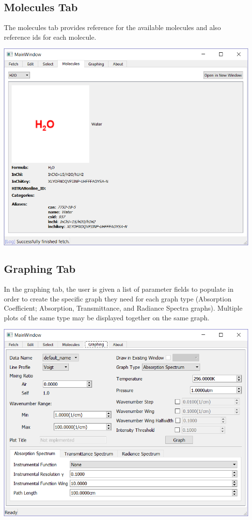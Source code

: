 \documentclass[12pt]{article}
\begin{document}
\subsection{Molecules Tab}
The molecules tab provides reference for the available molecules and also reference ids for each molecule.
\begin{center}
\includegraphics[scale = 0.6]{MainWindow_Molecules}
\end{center}

\subsection{Graphing Tab}
In the graphing tab, the user is given a list of parameter fields to populate in order to create the specific graph they need for each graph type (Absorption Coefficient; Absorption, Transmittance, and Radiance Spectra graphs). Multiple plots of the same type may be displayed together on the same graph.
\begin{center}
\includegraphics[scale = 0.6]{MainWindow_Graphing}
\end{center}
\end{document}
